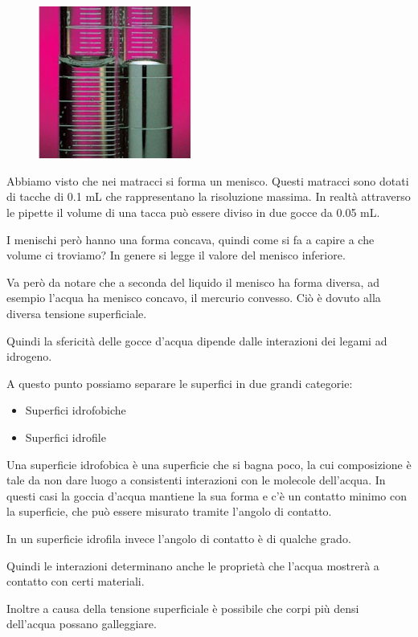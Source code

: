 \hspace{0.5cm}\begin{minipage}{0.35 \textwidth}
   \begin{figure}[H]
       \includegraphics[width=5cm]{immagini/menischi.png}
   \end{figure}
\end{minipage}
\begin{minipage}{0.6 \textwidth}
   \vspace{0.6cm}Abbiamo visto che nei matracci si forma un menisco.
   Questi matracci sono dotati di tacche di 0.1 mL che rappresentano la risoluzione massima. In realtà attraverso le pipette il volume di una tacca può essere diviso in due gocce da 0.05 mL.

   I menischi però hanno una forma concava, quindi come si fa a capire a che volume ci troviamo? In genere si legge il valore del menisco inferiore.

   Va però da notare che a seconda del liquido il menisco ha forma diversa, ad esempio l'acqua ha menisco concavo, il mercurio convesso. Ciò è dovuto alla diversa tensione superficiale.
\end{minipage}

\vspace{0.2cm}Quindi la sfericità delle gocce d'acqua dipende dalle interazioni dei legami ad idrogeno.

A questo punto possiamo separare le superfici in due grandi categorie:

\begin{itemize}
   \item Superfici idrofobiche
   \item Superfici idrofile
\end{itemize}

Una superficie idrofobica è una superficie che si bagna poco, la cui composizione è tale da non dare luogo a consistenti interazioni con le molecole dell'acqua. In questi casi la goccia d'acqua mantiene la sua forma e c'è un contatto minimo con la superficie, che può essere misurato tramite l'angolo di contatto.

In un superficie idrofila invece l'angolo di contatto è di qualche grado.

Quindi le interazioni determinano anche le proprietà che l'acqua mostrerà a contatto con certi materiali.

Inoltre a causa della tensione superficiale è possibile che corpi più densi dell'acqua possano galleggiare.